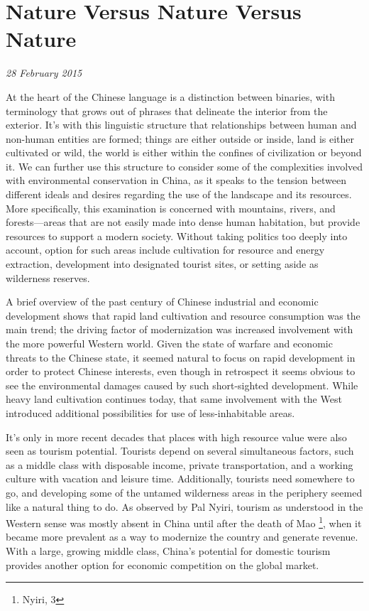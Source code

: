\section{Nature Versus Nature Versus Nature}

\textit{28 February 2015}

At the heart of the Chinese language is a distinction between binaries, with
terminology that grows out of phrases that delineate the interior from the
exterior. It's with this linguistic structure that relationships between human
and non-human entities are formed; things are either outside or inside, land is
either cultivated or wild, the world is either within the confines of
civilization or beyond it. We can further use this structure to consider some of
the complexities involved with environmental conservation in China, as it speaks
to the tension between different ideals and desires regarding the use of the
landscape and its resources. More specifically, this examination is concerned
with mountains, rivers, and forests---areas that are not easily made into dense
human habitation, but provide resources to support a modern society. Without
taking politics too deeply into account, option for such areas include
cultivation for resource and energy extraction, development into designated
tourist sites, or setting aside as wilderness reserves.

A brief overview of the past century of Chinese industrial and economic
development shows that rapid land cultivation and resource consumption was the
main trend; the driving factor of modernization was increased involvement with
the more powerful Western world. Given the state of warfare and economic threats
to the Chinese state, it seemed natural to focus on rapid development in order
to protect Chinese interests, even though in retrospect it seems obvious to see
the environmental damages caused by such short-sighted development. While heavy
land cultivation continues today, that same involvement with the West introduced
additional possibilities for use of less-inhabitable areas.

It's only in more recent decades that places with high resource value were also
seen as tourism potential. Tourists depend on several simultaneous factors, such
as a middle class with disposable income, private transportation, and a working
culture with vacation and leisure time. Additionally, tourists need somewhere to
go, and developing some of the untamed wilderness areas in the periphery seemed
like a natural thing to do. As observed by Pal Nyiri, tourism as understood in
the Western sense was mostly absent in China until after the death of Mao
\footnote{Nyiri, 3}, when it became more prevalent as a way to modernize the
country and generate revenue. With a large, growing middle class, China's
potential for domestic tourism provides another option for economic competition
on the global market.

